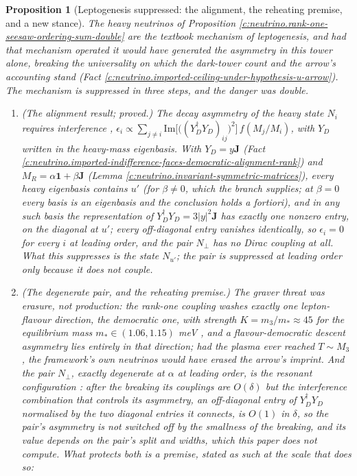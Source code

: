 \documentclass[11pt]{article}
\newtheorem{proposition}[theorem]{Proposition}
\theoremstyle{definition}
\theoremstyle{plain}
\newcommand{\changedmark}[2]{\marginpar{\raggedright\scriptsize\color{#1}#2}}
\providecommand{\J}{}\renewcommand{\J}{\mathbf{J}}
\begin{document}
\begin{proposition}[Leptogenesis suppressed: the alignment, the reheating premise, and a new stance]\label{c:neutrino.leptogenesis-suppressed-alignment-reheating-premise-new}
\changedmark{gray}{reworded}
The heavy neutrinos of Proposition \ref{c:neutrino.rank-one-seesaw-ordering-sum-double} are the textbook mechanism of leptogenesis, and had that mechanism operated it would have generated the asymmetry in this tower alone, breaking the universality on which the dark-tower count and the arrow's accounting stand (Fact \ref{c:neutrino.imported-ceiling-under-hypothesis-u-arrow}). The mechanism is suppressed in three steps, and the danger was double.
\begin{enumerate}
\item \emph{(The alignment result; proved.)} The decay asymmetry of the heavy state $N_{i}$ requires interference \cite{FukugitaYanagida1986, DavidsonNardiNir2008}, $\epsilon_{i} \propto \sum_{j \neq i}\mathrm{Im}\bigl[\bigl((Y_{D}^{\dagger}Y_{D})_{ij}\bigr)^{2}\bigr]\,f(M_{j}/M_{i})$, with $Y_{D}$ written in the heavy-mass eigenbasis. With $Y_{D} = y\J$ (Fact \ref{c:neutrino.imported-indifference-faces-democratic-alignment-rank}) and $M_{R} = \alpha\mathbf{1} + \beta\J$ (Lemma \ref{c:neutrino.invariant-symmetric-matrices}), every heavy eigenbasis contains $u'$ (for $\beta \neq 0$, which the branch supplies; at $\beta = 0$ every basis is an eigenbasis and the conclusion holds a fortiori), and in any such basis the representation of $Y_{D}^{\dagger}Y_{D} = 3|y|^{2}\J$ has exactly one nonzero entry, on the diagonal at $u'$; every off-diagonal entry vanishes identically, so $\epsilon_{i} = 0$ for every $i$ at leading order, and the pair $N_{\perp}$ has no Dirac coupling at all. What this suppresses is the state $N_{u'}$; the pair is suppressed at leading order only because it does not couple.
\item \emph{(The degenerate pair, and the reheating premise.)} The graver threat was erasure, not production: the rank-one coupling washes exactly one lepton-flavour direction, the democratic one, with strength $K = m_{3}/m_{*} \approx 45$ for the equilibrium mass $m_{*} \in (1.06, 1.15)$ meV \cite{DavidsonNardiNir2008}, and a flavour-democratic descent asymmetry lies entirely in that direction; had the plasma ever reached $T \sim M_{3}$, the framework's own neutrinos would have erased the arrow's imprint. And the pair $N_{\perp}$, exactly degenerate at $\alpha$ at leading order, is the resonant configuration \cite{PilaftsisUnderwood2004}: after the breaking its couplings are $O(\delta)$ but the interference combination that controls its asymmetry, an off-diagonal entry of $Y_{D}^{\dagger}Y_{D}$ normalised by the two diagonal entries it connects, is $O(1)$ in $\delta$, so the pair's asymmetry is not switched off by the smallness of the breaking, and its value depends on the pair's split and widths, which this paper does not compute. What protects both is a premise, stated as such at the scale that does so:

\end{enumerate}
\end{proposition}
\end{document}
